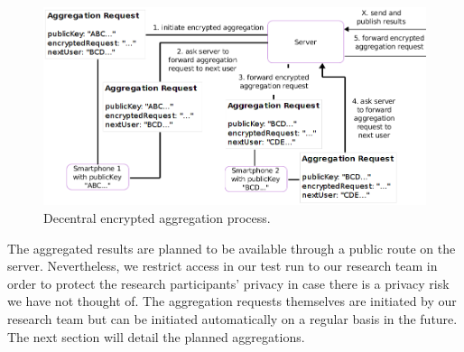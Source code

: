  \begin{figure}[h!]
	\includegraphics[width=\textwidth]{data/diagrams/decentral-encrypted-aggregation.png}
	\caption{Decentral encrypted aggregation process.}
	\label{decentral-aggregation-encrypted}
\end{figure}

 The aggregated results are planned to be available through a public route on the server. Nevertheless, we restrict access in our test run to our research team in order to protect the research participants' privacy in case there is a privacy risk we have not thought of. The aggregation requests themselves are initiated by our research team but can be initiated automatically on a regular basis in the future. The next section will detail the planned aggregations.

